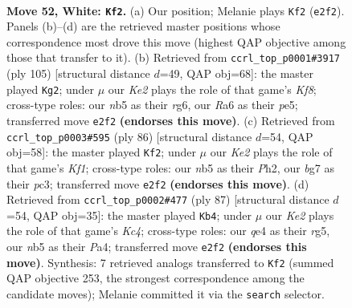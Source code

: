 \documentclass[11pt]{article}
\begin{document}
\clearpage

\begin{figure}[p]\centering
\begin{subfigure}{0.46\textwidth}\centering
\resizebox{\linewidth}{!}{%
\newchessgame
\chessboard[
  setfen={6k1/1r3pb1/R7/1n1P2R1/4q3/8/4K1N1/8 w - - 0 52},
  showmover=false,
  pgfstyle=straightmove, color=movearrow, markmove={e2-f2}
]}
\caption{}
\end{subfigure}\hfill
\begin{subfigure}{0.46\textwidth}\centering
\resizebox{\linewidth}{!}{%
\newchessgame
\chessboard[
  setfen={8/r5n1/6R1/4P3/P7/1P4N1/1K5p/5k2 b - - 3 53},
  showmover=false,
  pgfstyle=straightmove, color=movearrow, markmove={f1-g2}
]}
\caption{}
\end{subfigure}
\\[4pt]
\begin{subfigure}{0.46\textwidth}\centering
\resizebox{\linewidth}{!}{%
\newchessgame
\chessboard[
  setfen={8/6k1/8/7p/P1q5/2p2R2/2R3PP/5K2 w - - 1 44},
  showmover=false,
  pgfstyle=straightmove, color=movearrow, markmove={f1-f2}
]}
\caption{}
\end{subfigure}\hfill
\begin{subfigure}{0.46\textwidth}\centering
\resizebox{\linewidth}{!}{%
\newchessgame
\chessboard[
  setfen={8/2nr2p1/8/2k3RP/p7/5K2/B4P2/8 b - - 3 44},
  showmover=false,
  pgfstyle=straightmove, color=movearrow, markmove={c5-b4}
]}
\caption{}
\end{subfigure}
\caption{\textbf{Move 52, White: \texttt{Kf2}.} (a) Our position; Melanie plays \texttt{Kf2} (\texttt{e2f2}). Panels (b)--(d) are the retrieved master positions whose correspondence most drove this move (highest QAP objective among those that transfer to it). (b) Retrieved from \texttt{ccrl\_top\_p0001\#3917} (ply 105) [structural distance $d$=49, QAP obj=68]: the master played \texttt{Kg2}; under $\mu$ our \emph{Ke2} plays the role of that game's \emph{Kf8}; cross-type roles: our \emph{n}b5 as their \emph{r}g6, our \emph{R}a6 as their \emph{p}e5; transferred move \texttt{e2f2} \textbf{(endorses this move)}. (c) Retrieved from \texttt{ccrl\_top\_p0003\#595} (ply 86) [structural distance $d$=54, QAP obj=58]: the master played \texttt{Kf2}; under $\mu$ our \emph{Ke2} plays the role of that game's \emph{Kf1}; cross-type roles: our \emph{n}b5 as their \emph{P}h2, our \emph{b}g7 as their \emph{p}c3; transferred move \texttt{e2f2} \textbf{(endorses this move)}. (d) Retrieved from \texttt{ccrl\_top\_p0002\#477} (ply 87) [structural distance $d$=54, QAP obj=35]: the master played \texttt{Kb4}; under $\mu$ our \emph{Ke2} plays the role of that game's \emph{Kc4}; cross-type roles: our \emph{q}e4 as their \emph{r}g5, our \emph{n}b5 as their \emph{P}a4; transferred move \texttt{e2f2} \textbf{(endorses this move)}. Synthesis: 7 retrieved analogs transferred to \texttt{Kf2} (summed QAP objective 253, the strongest correspondence among the candidate moves); Melanie committed it via the \texttt{search} selector.}
\label{fig:thought-m102}
\end{figure}
\end{document}
